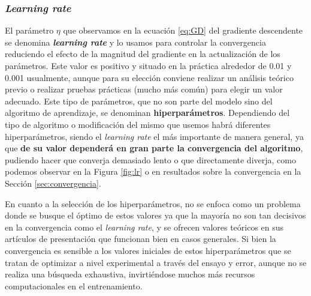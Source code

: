 \subsubsection{\textit{Learning rate}}

El parámetro $\eta$ que observamos en la ecuación \eqref{eq:GD} del gradiente descendente se denomina \textbf{\textit{learning rate}} y lo usamos para controlar la convergencia reduciendo el efecto de la magnitud del gradiente en la actualización de los parámetros. Este valor es positivo y situado en la práctica alrededor de 0.01 y 0.001 usualmente, aunque para su elección conviene realizar un análisis teórico previo o realizar pruebas prácticas (mucho más común) para elegir un valor adecuado. Este tipo de parámetros, que no son parte del modelo sino del algoritmo de aprendizaje, se denominan \textbf{hiperparámetros}. Dependiendo del tipo de algoritmo o modificación del mismo que usemos habrá diferentes hiperparámetros, siendo el \textit{learning rate} el más importante de manera general, ya que \textbf{de su valor dependerá en gran parte la convergencia del algoritmo}, pudiendo hacer que converja demasiado lento o que directamente diverja, como podemos observar en la Figura \ref{fig:lr} o en resultados sobre la convergencia en la Sección \ref{sec:convergencia}.

En cuanto a la selección de los hiperparámetros, no se enfoca como un problema donde se busque el óptimo de estos valores ya que la mayoría no son tan decisivos en la convergencia como el \textit{learning rate}, y se ofrecen valores teóricos en sus artículos de presentación que funcionan bien en casos generales. Si bien la convergencia es sensible a los valores iniciales de estos hiperparámetros que se tratan de optimizar a nivel experimental a través del ensayo y error, aunque no se realiza una búsqueda exhaustiva, invirtiéndose muchos más recursos computacionales en el entrenamiento.



